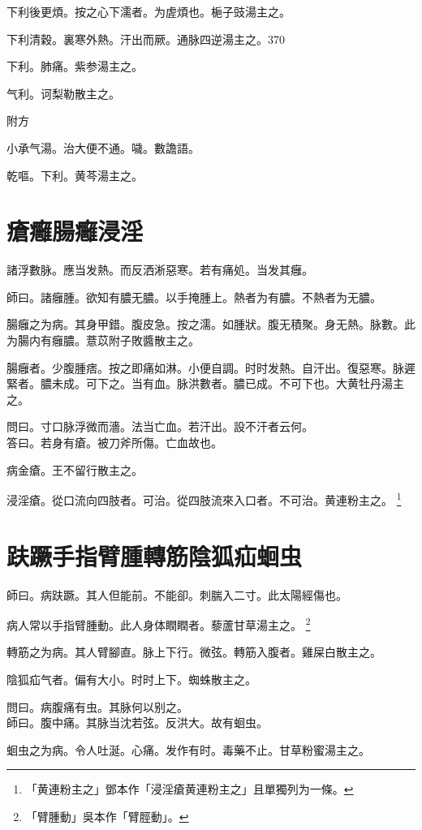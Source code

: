 \documentclass[12pt,twoside,UTF8,b5paper]{ctexbook}
\begin{document}
下利後更煩。按之心下濡者。为虗煩也。梔子豉湯主之。

下利清穀。裏寒外熱。汗出而厥。通脉四逆湯主之。370

下利。肺痛。紫参湯主之。

气利。诃梨勒散主之。

附方

小承气湯。治大便不通。噦。數譫語。

乾嘔。下利。黄芩湯主之。

\chapter{瘡癰腸癰浸淫}

諸浮數脉。應当发熱。而反洒淅惡寒。若有痛処。当发其癰。

師曰。諸癰腫。欲知有膿无膿。以手掩腫上。熱者为有膿。不熱者为无膿。

腸癰之为病。其身甲錯。腹皮急。按之濡。如腫狀。腹无積聚。身无熱。脉數。此为腸内有癰膿。薏苡附子敗醬散主之。

腸癰者。少腹腫痞。按之即痛如淋。小便自調。时时发熱。自汗出。復惡寒。脉遲緊者。膿未成。可下之。当有血。脉洪數者。膿已成。不可下也。大黄牡丹湯主之。

問曰。寸口脉浮微而濇。法当亡血。若汗出。設不汗者云何。\\
答曰。若身有瘡。被刀斧所傷。亡血故也。

病金瘡。王不留行散主之。

浸淫瘡。從口流向四肢者。可治。從四肢流來入口者。不可治。黄連粉主之。
	\footnote{「黄連粉主之」鄧本作「浸淫瘡黄連粉主之」且單獨列为一條。}

\chapter{趺蹶手指臂腫轉筋陰狐疝蛔虫}

師曰。病趺蹶。其人但能前。不能卻。刺腨入二寸。此太陽經傷也。

病人常以手指臂腫動。此人身体瞤瞤者。藜蘆甘草湯主之。
	\footnote{「臂腫動」吳本作「臂脛動」。}

轉筋之为病。其人臂腳直。脉上下行。微弦。轉筋入腹者。雞屎白散主之。

陰狐疝气者。偏有大小。时时上下。蜘蛛散主之。

問曰。病腹痛有虫。其脉何以别之。\\
師曰。腹中痛。其脉当沈若弦。反洪大。故有蛔虫。

蛔虫之为病。令人吐涎。心痛。发作有时。毒藥不止。甘草粉蜜湯主之。
\end{document}
